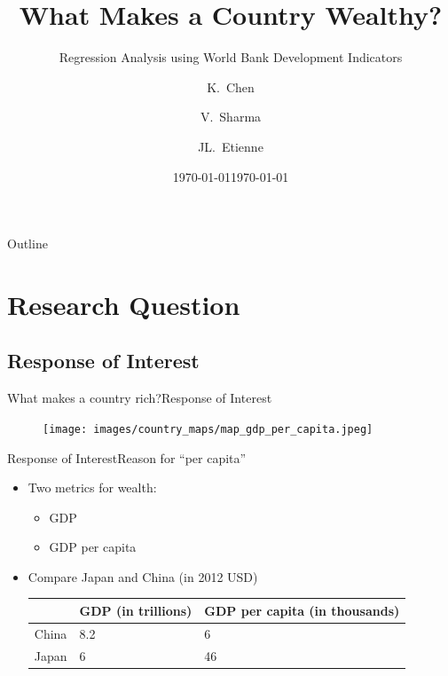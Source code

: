 \documentclass{beamer}
\title{What Makes a Country Wealthy?}
\subtitle{Regression Analysis using World Bank Development Indicators}
\date{\today}
\author{K.~Chen\inst{1} \and V.~Sharma\inst{1} \and JL.~Etienne\inst{1}}
\institute[Williams College] 
{
  \inst{1}
  Statistics 202 \\
  Williams College
}
\date{\today}
\begin{document}
\begin{frame}
\titlepage
\end{frame}

\begin{frame}{Outline}
\tableofcontents%
\end{frame}


\section{Research Question}

\subsection{Response of Interest}
\begin{frame}{What makes a country rich?}{Response of Interest}
  \begin{figure}
    \texttt{[image: images/country\_maps/map\_gdp\_per\_capita.jpeg]}
  \end{figure}
\end{frame}

\begin{frame}{Response of Interest}{Reason for ``per capita''}
\begin{itemize}
\item Two metrics for wealth:
  \begin{itemize}
  \item GDP
  \item GDP per capita
  \end{itemize}
\item Compare Japan and China (in 2012 USD)
  \begin{table}
    \begin{tabular}{| l | l | l |} \hline
      ~     & GDP (in trillions) & GDP per capita (in thousands) \\ \hline
      China & 8.2                            & 6                                         \\ \hline
      Japan & 6                              & 46                                        \\ \hline
    \end{tabular}
  \end{table}
\end{itemize}
\end{frame}
\end{document}

